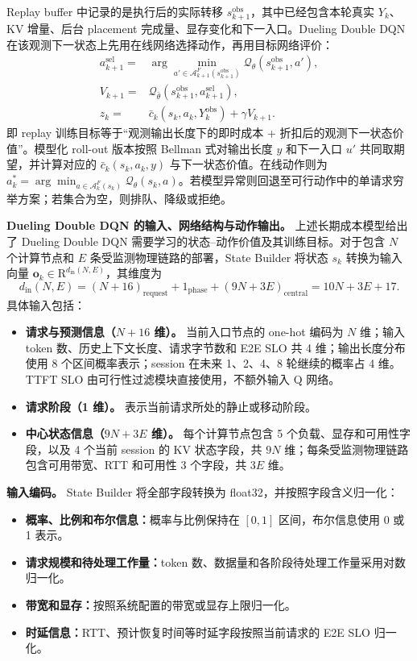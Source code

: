 Replay buffer 中记录的是执行后的实际转移 \(s_{k+1}^{\mathrm{obs}}\)，其中已经包含本轮真实 \(Y_k\)、KV 增量、后台 placement 完成量、显存变化和下一入口。Dueling Double DQN 在该观测下一状态上先用在线网络选择动作，再用目标网络评价：
\[
\begin{array}{rl}
a_{k+1}^{\mathrm{sel}}
={}&\displaystyle\arg\min_{a'\in\mathcal A_{k+1}^F(s_{k+1}^{\mathrm{obs}})}
\mathcal Q_\theta(s_{k+1}^{\mathrm{obs}},a'),\\
V_{k+1}
={}&\mathcal Q_{\bar\theta}
(s_{k+1}^{\mathrm{obs}},a_{k+1}^{\mathrm{sel}}),\\
z_k
={}&\bar c_k(s_k,a_k,Y_k^{\mathrm{obs}})
+\gamma V_{k+1}.
\end{array}
\]
即 replay 训练目标等于“观测输出长度下的即时成本 + 折扣后的观测下一状态价值”。模型化 roll-out 版本按照 Bellman 式对输出长度 \(y\) 和下一入口 \(u'\) 共同取期望，并计算对应的 \(\bar c_k(s_k,a_k,y)\) 与下一状态价值。在线动作则为 \(a_k^*=\arg\min_{a\in\mathcal A_k^F(s_k)}\mathcal Q_\theta(s_k,a)\)。若模型异常则回退至可行动作中的单请求穷举方案；若集合为空，则排队、降级或拒绝。

\noindent\textbf{Dueling Double DQN 的输入、网络结构与动作输出。}
上述长期成本模型给出了 Dueling Double DQN 需要学习的状态--动作价值及其训练目标。对于包含 \(N\) 个计算节点和 \(E\) 条受监测物理链路的部署，State Builder 将状态 \(s_k\) 转换为输入向量 \(\mathbf o_k\in\mathrm R^{d_{\mathrm{in}}(N,E)}\)，其维度为
\[
d_{\mathrm{in}}(N,E)
=
(N+16)_{\mathrm{request}}
+1_{\mathrm{phase}}
+(9N+3E)_{\mathrm{central}}
=10N+3E+17.
\]
具体输入包括：
\begin{itemize}
    \item \textbf{请求与预测信息（\(N+16\) 维）。} 当前入口节点的 one-hot 编码为 \(N\) 维；输入 token 数、历史上下文长度、请求字节数和 E2E SLO 共 4 维；输出长度分布使用 8 个区间概率表示；session 在未来 1、2、4、8 轮继续的概率占 4 维。TTFT SLO 由可行性过滤模块直接使用，不额外输入 Q 网络。
    \item \textbf{请求阶段（1 维）。} 表示当前请求所处的静止或移动阶段。
    \item \textbf{中心状态信息（\(9N+3E\) 维）。} 每个计算节点包含 5 个负载、显存和可用性字段，以及 4 个当前 session 的 KV 状态字段，共 \(9N\) 维；每条受监测物理链路包含可用带宽、RTT 和可用性 3 个字段，共 \(3E\) 维。
\end{itemize}

\textbf{输入编码。} State Builder 将全部字段转换为 float32，并按照字段含义归一化：
\begin{itemize}
    \item \textbf{概率、比例和布尔信息：}概率与比例保持在 \([0,1]\) 区间，布尔信息使用 0 或 1 表示。
    \item \textbf{请求规模和待处理工作量：}token 数、数据量和各阶段待处理工作量采用对数归一化。
    \item \textbf{带宽和显存：}按照系统配置的带宽或显存上限归一化。
    \item \textbf{时延信息：}RTT、预计恢复时间等时延字段按照当前请求的 E2E SLO 归一化。
\end{itemize}

